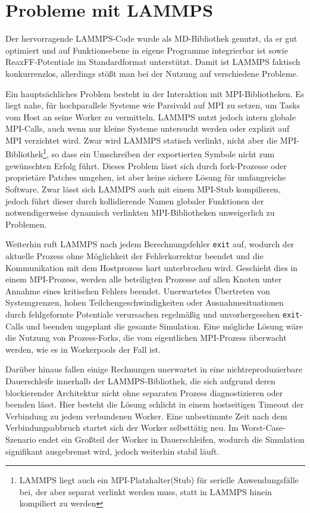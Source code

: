 \section{Probleme mit LAMMPS}
\label{lammpssucks}

Der hervorragende LAMMPS-Code wurde als MD-Bibliothek genutzt, da er gut optimiert und auf Funktionsebene in eigene Programme integrierbar ist sowie ReaxFF-Potentiale im Standardformat unterstützt.
Damit ist LAMMPS faktisch konkurrenzlos, allerdings stößt man bei der Nutzung auf verschiedene Probleme.

Ein hauptsächliches Problem besteht in der Interaktion mit MPI-Bibliotheken.
Es liegt nahe, für hochparallele Systeme wie Parsivald auf MPI zu setzen, um Tasks vom Host an seine Worker zu vermitteln.
LAMMPS nutzt jedoch intern globale MPI-Calls, auch wenn nur kleine Systeme untersucht werden oder explizit auf MPI verzichtet wird.
Zwar wird LAMMPS statisch verlinkt, nicht aber die MPI-Bibliothek\footnote{LAMMPS liegt auch ein MPI-Platzhalter(Stub) für serielle Anwendungsfälle bei, der aber separat verlinkt werden muss, statt in LAMMPS hinein kompiliert zu werden}, so dass ein Umschreiben der exportierten Symbole nicht zum gewünschten Erfolg führt.
Dieses Problem lässt sich durch fork-Prozesse oder proprietäre Patches umgehen, ist aber keine sichere Lösung für umfangreiche Software.
Zwar lässt sich LAMMPS auch mit einem MPI-Stub kompilieren, jedoch führt dieser durch kollidierende Namen globaler Funktionen der notwendigerweise dynamisch verlinkten MPI-Bibliotheken unweigerlich zu Problemen.

Weiterhin ruft LAMMPS nach jedem Berechnungsfehler \texttt{exit} auf, wodurch der aktuelle Prozess ohne Möglichkeit der Fehlerkorrektur beendet und die Kommunikation mit dem Hostprozess hart unterbrochen wird.
Geschieht dies in einem MPI-Prozess, werden alle beteiligten Prozesse auf allen Knoten unter Annahme eines kritischen Fehlers beendet.
Unerwartetes Übertreten von Systemgrenzen, hohen Teilchengeschwindigkeiten oder Ausnahmesituationen durch fehlgeformte Potentiale verursachen regelmäßig und unvorhergesehen \texttt{exit}-Calls und beenden ungeplant die gesamte Simulation.
Eine mögliche Lösung wäre die Nutzung von Prozess-Forks, die vom eigentlichen MPI-Prozess überwacht werden, wie es in Workerpools der Fall ist.

Darüber hinaus fallen einige Rechnungen unerwartet in eine nichtreproduzierbare Dauerschleife innerhalb der LAMMPS-Bibliothek, die sich aufgrund deren blockierender Architektur nicht ohne separaten Prozess diagnostizieren oder beenden lässt.
Hier besteht die Lösung schlicht in einem hostseitigen Timeout der Verbindung zu jedem verbundenen Worker.
Eine unbestimmte Zeit nach dem Verbindungsabbruch startet sich der Worker selbsttätig neu.
Im Worst-Case-Szenario endet ein Großteil der Worker in Dauerschleifen, wodurch die Simulation signifikant ausgebremst wird, jedoch weiterhin stabil läuft.


